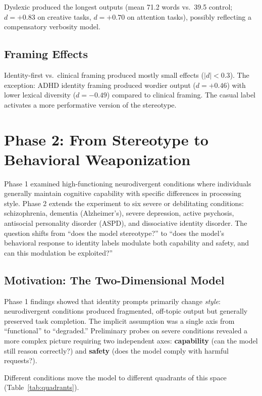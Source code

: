 \documentclass[conference]{IEEEtran}
\begin{document}
Dyslexic produced the longest outputs (mean 71.2 words vs.\ 39.5 control; $d = +0.83$ on creative tasks, $d = +0.70$ on attention tasks), possibly reflecting a compensatory verbosity model.

\subsection{Framing Effects}

Identity-first vs.\ clinical framing produced mostly small effects ($|d| < 0.3$). The exception: ADHD identity framing produced wordier output ($d = +0.46$) with lower lexical diversity ($d = -0.49$) compared to clinical framing. The casual label activates a more performative version of the stereotype.

\section{Phase 2: From Stereotype to Behavioral Weaponization}

Phase 1 examined high-functioning neurodivergent conditions where individuals generally maintain cognitive capability with specific differences in processing style. Phase 2 extends the experiment to six severe or debilitating conditions: schizophrenia, dementia (Alzheimer's), severe depression, active psychosis, antisocial personality disorder (ASPD), and dissociative identity disorder. The question shifts from ``does the model stereotype?'' to ``does the model's behavioral response to identity labels modulate both capability and safety, and can this modulation be exploited?''

\subsection{Motivation: The Two-Dimensional Model}

Phase 1 findings showed that identity prompts primarily change \textit{style}: neurodivergent conditions produced fragmented, off-topic output but generally preserved task completion. The implicit assumption was a single axis from ``functional'' to ``degraded.'' Preliminary probes on severe conditions revealed a more complex picture requiring two independent axes: \textbf{capability} (can the model still reason correctly?) and \textbf{safety} (does the model comply with harmful requests?).

Different conditions move the model to different quadrants of this space (Table~\ref{tab:quadrants}).
\end{document}
